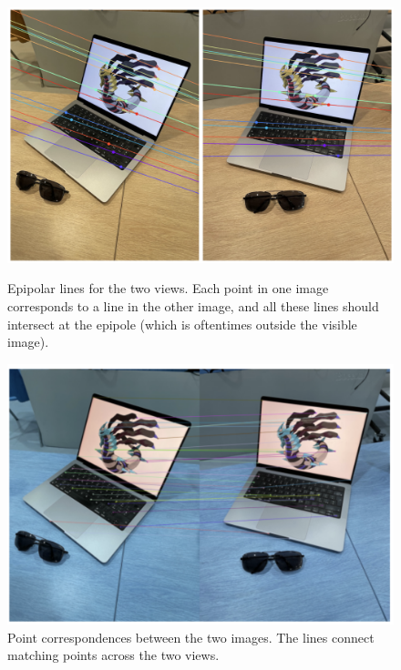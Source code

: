 \begin{figure}[htbp]
    \begin{minipage}[t]{0.48\textwidth}
        \centering
        \includegraphics[width=\linewidth]{img/epipolar.png}
        \caption{Epipolar lines for the two views. Each point in one image corresponds to a line in the other image, and all these lines should intersect at the epipole (which is oftentimes outside the visible image).}
        \label{epipolar}
    \end{minipage}
    \hfill
    \begin{minipage}[t]{0.48\textwidth}
        \centering
        \includegraphics[width=\linewidth]{img/matches.png}
        \caption{Point correspondences between the two images. The lines connect matching points across the two views.}
        \label{matches}
    \end{minipage}
\end{figure}

